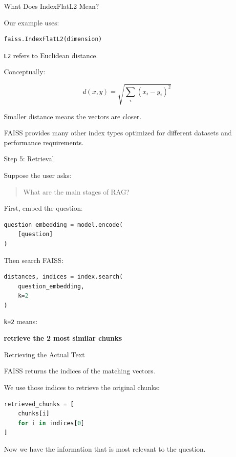 \documentclass[aspectratio=169]{beamer}
\begin{document}
\begin{frame}[fragile]{What Does IndexFlatL2 Mean?}

Our example uses:

\begin{lstlisting}[language=Python]
faiss.IndexFlatL2(dimension)
\end{lstlisting}

\texttt{L2} refers to Euclidean distance.

Conceptually:

\[
d(x,y) =
\sqrt{\sum_i (x_i-y_i)^2}
\]

Smaller distance means the vectors are closer.

\vspace{0.3cm}

FAISS provides many other index types optimized for
different datasets and performance requirements.

\end{frame}

\begin{frame}[fragile]{Step 5: Retrieval}

Suppose the user asks:

\begin{quote}
What are the main stages of RAG?
\end{quote}

First, embed the question:

\begin{lstlisting}[language=Python]
question_embedding = model.encode(
    [question]
)
\end{lstlisting}

Then search FAISS:

\begin{lstlisting}[language=Python]
distances, indices = index.search(
    question_embedding,
    k=2
)
\end{lstlisting}

\texttt{k=2} means:

\begin{center}
\textbf{retrieve the 2 most similar chunks}
\end{center}

\end{frame}

\begin{frame}[fragile]{Retrieving the Actual Text}

FAISS returns the indices of the matching vectors.

We use those indices to retrieve the original chunks:

\begin{lstlisting}[language=Python]
retrieved_chunks = [
    chunks[i]
    for i in indices[0]
]
\end{lstlisting}

Now we have the information that is
most relevant to the question.

\end{frame}
\end{document}
